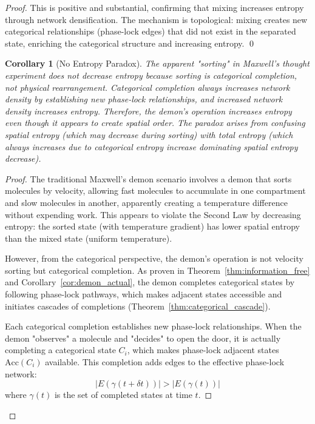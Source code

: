 \documentclass[12pt,a4paper]{article}
\newtheorem{corollary}[theorem]{Corollary}
\theoremstyle{definition}
\theoremstyle{remark}
\newcommand{\accessible}{\text{Acc}}
\begin{document}
\begin{proof}
This is positive and substantial, confirming that mixing increases entropy through network densification. The mechanism is topological: mixing creates new categorical relationships (phase-lock edges) that did not exist in the separated state, enriching the categorical structure and increasing entropy. \qed

\begin{corollary}[No Entropy Paradox]
\label{cor:no_entropy_paradox}
The apparent "sorting" in Maxwell's thought experiment does not decrease entropy because sorting is categorical completion, not physical rearrangement. Categorical completion always increases network density by establishing new phase-lock relationships, and increased network density increases entropy. Therefore, the demon's operation increases entropy even though it appears to create spatial order. The paradox arises from confusing spatial entropy (which may decrease during sorting) with total entropy (which always increases due to categorical entropy increase dominating spatial entropy decrease).
\end{corollary}

\begin{proof}
The traditional Maxwell's demon scenario involves a demon that sorts molecules by velocity, allowing fast molecules to accumulate in one compartment and slow molecules in another, apparently creating a temperature difference without expending work. This appears to violate the Second Law by decreasing entropy: the sorted state (with temperature gradient) has lower spatial entropy than the mixed state (uniform temperature).

However, from the categorical perspective, the demon's operation is not velocity sorting but categorical completion. As proven in Theorem~\ref{thm:information_free} and Corollary~\ref{cor:demon_actual}, the demon completes categorical states by following phase-lock pathways, which makes adjacent states accessible and initiates cascades of completions (Theorem~\ref{thm:categorical_cascade}).

Each categorical completion establishes new phase-lock relationships. When the demon "observes" a molecule and "decides" to open the door, it is actually completing a categorical state $C_i$, which makes phase-lock adjacent states $\accessible(C_i)$ available. This completion adds edges to the effective phase-lock network:
\begin{equation}
|E(\gamma(t + \delta t))| > |E(\gamma(t))|
\end{equation}
where $\gamma(t)$ is the set of completed states at time $t$.


\end{proof}
\end{proof}
\end{document}

